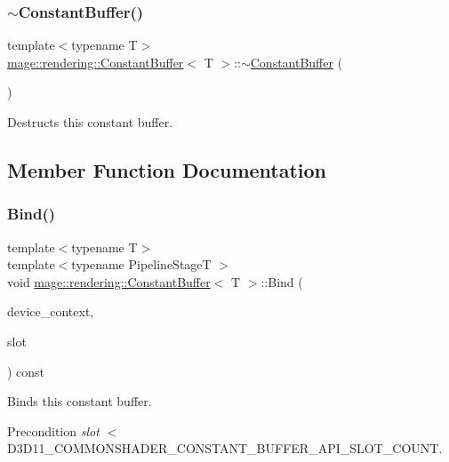 \subsubsection{\texorpdfstring{$\sim$\+Constant\+Buffer()}{~ConstantBuffer()}}
{\footnotesize\ttfamily template$<$typename T$>$ \\
\mbox{\hyperlink{classmage_1_1rendering_1_1_constant_buffer}{mage\+::rendering\+::\+Constant\+Buffer}}$<$ T $>$\+::$\sim$\mbox{\hyperlink{classmage_1_1rendering_1_1_constant_buffer}{Constant\+Buffer}} (\begin{DoxyParamCaption}{ }\end{DoxyParamCaption})\hspace{0.3cm}{\ttfamily [default]}}

Destructs this constant buffer. 

\subsection{Member Function Documentation}
\mbox{\label{classmage_1_1rendering_1_1_constant_buffer_a49c3982ed5b6a01ddc8cadd509eff7f8}} 
\subsubsection{\texorpdfstring{Bind()}{Bind()}}
{\footnotesize\ttfamily template$<$typename T$>$ \\
template$<$typename Pipeline\+StageT $>$ \\
void \mbox{\hyperlink{classmage_1_1rendering_1_1_constant_buffer}{mage\+::rendering\+::\+Constant\+Buffer}}$<$ T $>$\+::Bind (\begin{DoxyParamCaption}\item[{I\+D3\+D11\+Device\+Context \&}]{device\+\_\+context,  }\item[{\mbox{\hyperlink{namespacemage_aa5d6eaabaac3cdd01873d6a3d27e90f3}{U32}}}]{slot }\end{DoxyParamCaption}) const\hspace{0.3cm}{\ttfamily [noexcept]}}

Binds this constant buffer.

\begin{DoxyPrecond}{Precondition}
{\itshape slot} $<$ {\ttfamily D3\+D11\+\_\+\+C\+O\+M\+M\+O\+N\+S\+H\+A\+D\+E\+R\+\_\+\+C\+O\+N\+S\+T\+A\+N\+T\+\_\+\+B\+U\+F\+F\+E\+R\+\_\+\+A\+P\+I\+\_\+\+S\+L\+O\+T\+\_\+\+C\+O\+U\+NT}. 
\end{DoxyPrecond}

